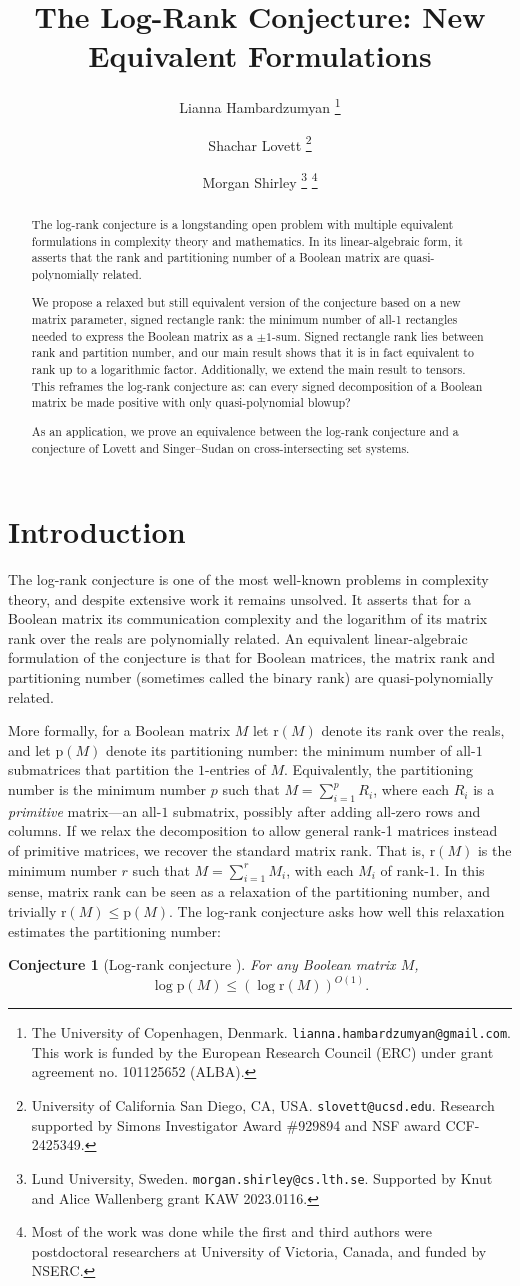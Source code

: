 \documentclass[11pt]{article}
\title{The Log-Rank Conjecture: New Equivalent Formulations}
\author{Lianna Hambardzumyan \thanks{The University of Copenhagen, Denmark. \texttt{lianna.hambardzumyan@gmail.com}. This work is funded by the European Research Council (ERC) under grant agreement no. 101125652 (ALBA).} \footnotemark[4]
\and
Shachar Lovett \thanks{University of California San Diego, CA, USA. \texttt{slovett@ucsd.edu}. Research supported by Simons Investigator Award \#929894 and NSF award CCF-2425349.}
\and
Morgan Shirley \thanks{Lund University, Sweden. \texttt{morgan.shirley@cs.lth.se}. Supported by Knut and Alice Wallenberg grant KAW 2023.0116.} \thanks{Most of the work was done while the first and third authors were postdoctoral researchers at University of Victoria, Canada, and funded by NSERC.}
}
\theoremstyle{plain}
\newtheorem{conjecture}[thm]{Conjecture}
\theoremstyle{remark}
\def\r{{\mathrm{r}}}
\def\p{{\mathrm{p}}}
\begin{document}
	
\maketitle

\begin{abstract}
	The log-rank conjecture is a longstanding open problem with multiple equivalent formulations in complexity theory and mathematics. In its linear-algebraic form, it asserts that the rank and partitioning number of a Boolean matrix are quasi-polynomially related.
	
	
	We propose a relaxed but still equivalent version of the conjecture based on a new matrix parameter, signed rectangle rank: the minimum number of all-1 rectangles needed to express the Boolean matrix as a $\pm 1$-sum. Signed rectangle rank lies between rank and partition number, and our main result shows that it is in fact equivalent to rank up to a logarithmic factor. Additionally, we extend the main result to tensors.
	This reframes the log-rank conjecture as: can every signed decomposition of a Boolean matrix be made positive with only quasi-polynomial blowup? 
	
	As an application, we prove an equivalence between the log-rank conjecture and a conjecture of Lovett and Singer–Sudan on cross-intersecting set systems. 
\end{abstract}

\section{Introduction}
The log-rank conjecture is one of the most well-known problems in complexity theory, and despite extensive work it remains unsolved. It asserts that for a Boolean matrix its communication complexity and the logarithm of its matrix rank over the reals are polynomially related. An equivalent linear-algebraic formulation of the conjecture is that for Boolean matrices, the matrix rank and  partitioning number (sometimes called the binary rank) are quasi-polynomially related. 

More formally, for a Boolean matrix $M$ let $\r(M)$ denote its rank over the reals, and let $\p(M)$ denote its partitioning number: the minimum number of all-$1$ submatrices that partition the $1$-entries of $M$.  Equivalently, the partitioning number is the minimum number $p$ such that $M = \sum_{i=1}^p R_i$, where each $R_i$ is a \emph{primitive} matrix---an all-$1$ submatrix, possibly after adding all-zero rows and columns. 
If we relax the decomposition to allow general rank-1 matrices instead of primitive matrices, we recover the standard matrix rank. That is, $\r(M)$ is the minimum number $r$ such that $M=\sum_{i=1}^r M_i$, with each $M_i$ of rank-$1$. In this sense, matrix rank can be seen as a relaxation of the partitioning number, and trivially $\r(M) \leq \p(M)$. 
The log-rank conjecture asks how well this relaxation estimates the partitioning number:
\begin{conjecture}[Log-rank conjecture \cite{lovasz1988lattices}]\label{conj:log-rank}
	For any Boolean matrix $M$, \[\log \p(M) \leq (\log \r(M))^{O(1)}.\]
\end{conjecture}
\end{document}
